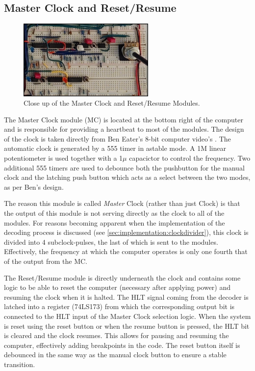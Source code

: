 \subsection{Master Clock and Reset/Resume} \label{sec:clock}
\begin{figure}[H]
  \centering
  \includegraphics[width=0.6\textwidth]{img/masterclockcloseup}
  \caption{Close up of the Master Clock and Reset/Resume Modules.}
  \label{fig:masterclockcloseup}
\end{figure}

The Master Clock module (MC) is located at the bottom right of the computer and is responsible for providing a heartbeat to most of the modules. The design of the clock is taken directly from Ben Eater's 8-bit computer video's \cite{beneater}. The automatic clock is generated by a 555 timer in astable mode. A 1M linear potentiometer is used together with a 1$\mu$ capacictor to control the frequency. Two additional 555 timers are used to debounce both the pushbutton for the manual clock and the latching push button which acts as a select between the two modes, as per Ben's design. 

The reason this module is called \emph{Master} Clock (rather than just Clock) is that the output of this module is not serving directly as the clock to all of the modules. For reasons becoming apparent when the implementation of the decoding process is discussed (see \ref{sec:implementation:clockdivider}), this clock is divided into 4 subclock-pulses, the last of which is sent to the modules. Effectively,  the frequency at which the computer operates is only one fourth that of the output from the MC.

The Reset/Resume module is directly underneath the clock and contains some logic to be able to reset the computer (necessary after applying power) and resuming the clock when it is halted. The HLT signal coming from the decoder is latched into a register (74LS173) from which the corresponding output bit is connected to the HLT input of the Master Clock selection logic. When the system is reset using the reset button or when the resume button is pressed, the HLT bit is cleared and the clock resumes. This allows for pausing and resuming the computer, effectively adding breakpoints in the code. The reset button itself is debounced in the same way as the manual clock button to ensure a stable transition. 

